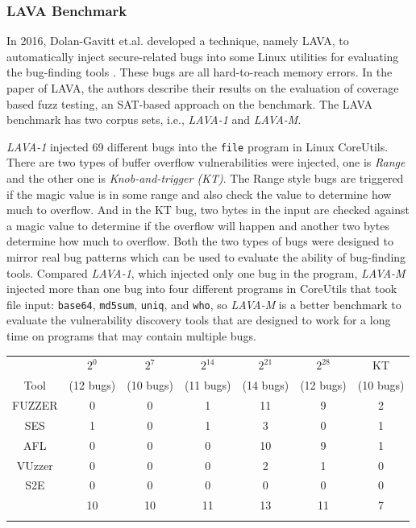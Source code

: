 \subsubsection{LAVA Benchmark}
In 2016, Dolan-Gavitt et.al. developed a technique, namely LAVA, to 
automatically inject secure-related bugs into some Linux utilities for 
evaluating the bug-finding tools \cite{dolan2016lava}. These bugs are 
all hard-to-reach memory errors. In the paper of LAVA, the authors describe 
their results on the evaluation of coverage based fuzz testing, an SAT-based 
approach on the benchmark. The LAVA benchmark has two corpus sets, 
i.e., \textit{LAVA-1} and \textit{LAVA-M}.

\textit{LAVA-1} injected 69 different bugs into the \texttt{file} program 
in Linux CoreUtils. There are two types of buffer overflow vulnerabilities 
were injected, one is \emph{Range} and the other one is 
\emph{Knob-and-trigger (KT)}. The Range style bugs are triggered if the 
magic value is in some range and also check the value to determine how much 
to overflow. And in the KT bug, two bytes in the input are checked against 
a magic value to determine if the overflow will happen and another two bytes 
determine how much to overflow. Both the two types of bugs were designed to 
mirror real bug patterns which can be used to evaluate the ability of 
bug-finding tools. Compared \textit{LAVA-1}, which injected only one bug 
in the program, \textit{LAVA-M} injected more than one bug into four 
different programs in CoreUtils that took file input: \texttt{base64}, 
\texttt{md5sum}, \texttt{uniq}, and \texttt{who}, so \textit{LAVA-M} is a 
better benchmark to evaluate the vulnerability discovery tools that are 
designed to work for a long time on programs that may contain multiple bugs.

\begin{table}[!b]
{\begin{tabular*}{20pc}{@{\extracolsep{\fill}}ccccccc@{\extracolsep{\fill}}}\toprule
& $2^0$ & $2^7$  & $2^{14}$ & $2^{21}$ & $2^{28}$ & KT \\
	      Tool   & (12 bugs) & (10 bugs) & (11 bugs) & (14 bugs) & (12 bugs) & (10 bugs)\\
\midrule
		FUZZER 		& 0   & 0   & 1    & 11    & 9     & 2  \\
		SES	        & 1   & 0   & 1    & 3     & 0     & 1  \\
		AFL		    & 0   & 0   & 0    & 10    & 9     & 1   \\
		VUzzer      & 0	  & 0   & 0	   & 2     & 1	   & 0   \\
		S2E			& 0   & 0   & 0    & 0     & 0     & 0   \\
		\prototype	& 10  & 10  & 11   & 13    & 11    & 7   \\
\botrule
\end{tabular*}}{}
\end{table}

